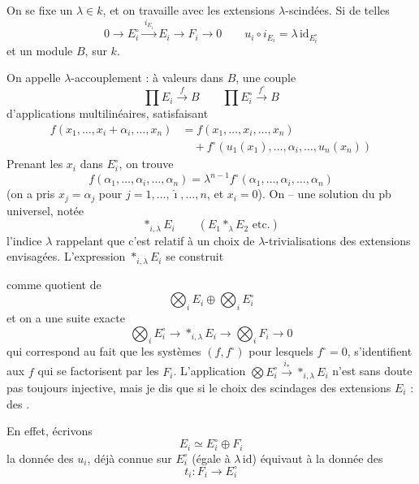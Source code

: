 \documentclass[11pt,a4paper]{article}
\begin{document}
On se fixe un $\lambda \in k$, et on travaille avec les extensions $\lambda$-scindées.   Si  de telles
\[
  0 \longrightarrow E_i^{\circ} \xrightarrow{\ i_{E_i}\ } E_i \longrightarrow F_i \longrightarrow 0
  \qquad u_i \circ i_{E_i} = \lambda\, \mathrm{id}_{E_i^{\circ}}
\]
et un module $B$, sur $k$. 

On appelle $\lambda$-accouplement : à valeurs dans $B$, une couple
\[
  \textstyle\prod E_i \xrightarrow{\ f\ } B \qquad \prod E_i^{\circ} \xrightarrow{\ f^{\circ}\ } B
\]
d'applications multilinéaires, satisfaisant
\begin{align*}
  f(x_1, \ldots, x_i + \alpha_i, \ldots, x_n) &= f(x_1, \ldots, x_i, \ldots, x_n) \\
  &\quad + f^{\circ}(u_1(x_1), \ldots, \alpha_i, \ldots, u_n(x_n))
\end{align*}
Prenant les $x_i$ dans $E_i^{\circ}$, on trouve
\[
  f(\alpha_1, \ldots, \alpha_i, \ldots, \alpha_n) = \lambda^{n-1} f^{\circ}(\alpha_1, \ldots, \alpha_i, \ldots, \alpha_n)
\]
(on a pris $x_j = \alpha_j$ pour $j = 1, \ldots, \hat{\imath}, \ldots, n$, et $x_i = 0$). On \ill{} -- une solution du pb universel, notée
\[
  \mathop{\ast}_{i,\lambda} E_i \qquad (E_1 \mathbin{\ast_\lambda} E_2 \text{ etc.})
\]
l'indice $\lambda$ rappelant que c'est relatif à un choix de $\lambda$-trivialisations des extensions envisagées. L'expression $\mathop{\ast}_{i,\lambda} E_i$ se construit

comme quotient  de
\[
  \textstyle\bigotimes_i E_i \oplus \bigotimes_i E_i^{\circ}
\]
et on a une suite exacte
\[
  \textstyle\bigotimes_i E_i^{\circ} \longrightarrow \mathop{\ast}_{i,\lambda} E_i \longrightarrow \bigotimes_i F_i \longrightarrow 0
\]
qui correspond au fait que les systèmes $(f, f^{\circ})$ pour lesquels $f^{\circ} = 0$, s'identifient aux $f$ qui se factorisent par les $F_i$. L'application $\bigotimes E_i^{\circ} \xrightarrow{\ i_\ast\ } \mathop{\ast}_{i,\lambda} E_i$ n'est sans doute pas toujours injective, mais je dis que si le choix des scindages des extensions $E_i$   \ill{} : \ill{} des \ill{}.

En effet, écrivons
\[
  E_i \simeq E_i^{\circ} \oplus F_i
\]
la donnée des $u_i$, déjà connue sur $E_i^{\circ}$ (égale à $\lambda\,\mathrm{id}$) équivaut à la donnée des
\[
  t_i : F_i \longrightarrow E_i^{\circ}
\]
\end{document}
